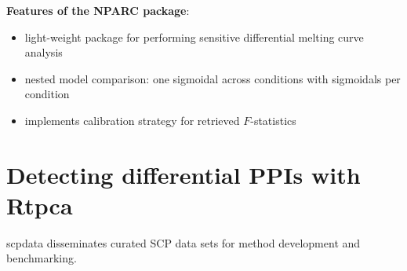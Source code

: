 \documentclass{article}
\newcommand{\hcode}[2][lgray]{{\ttfamily\color{vdgray}\colorbox{#1}{#2}}}
\begin{document}
\begin{multicols}{2}
\begin{minipage}[t]{\linewidth}
  \textbf{Features of the \hcode{NPARC} package}:

  \begin{itemize}

  \item light-weight package for performing sensitive differential melting curve analysis
  \item nested model comparison: one sigmoidal across conditions with sigmoidals per condition
  \item implements calibration strategy for retrieved $F$-statistics

  \end{itemize}
\end{minipage}


\noindent
\begin{minipage}[t]{\linewidth}
  \vspace{0.55cm}
  \section*{\huge Detecting differential PPIs with \hcode{Rtpca}}
  
  \hcode{scpdata} disseminates curated SCP data sets for method 
  development and benchmarking.
  \vspace{0.1cm}
  

\end{minipage}
\end{multicols}
\end{document}
